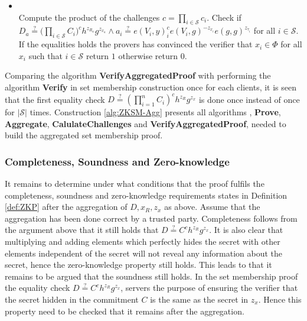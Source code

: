 \begin{algorithm}[]
\begin{itemize}
\item{} \\
Compute the product of the challenges $c=\prod_{i\in\mathcal{S}} c_i$. Check if $D_a\overset{?}{=} \big( \prod_{i\in\mathcal{S}}C_i\big)^ch^{z_R_a}g^{z_x_a}\wedge a_i \overset{?}{=} e(V_i,y)^c_i e(V_i,g)^{-z_{x_i}}e(g,g)^{z_{\tau_i}}$ for all $i\in\mathcal{S}$. If the equalities holds the provers has convinced the verifier that $x_i\in\Phi$ for all $x_i$ such that $i\in\mathcal{S}$ return $1$ otherwise return $0$.
\end{itemize}
\label{alg:ZKSM-Agg}
\end{algorithm} 
 
Comparing the algorithm \textbf{VerifyAggregatedProof} with performing the algorithm \textbf{Verify} in set membership construction once for each clients, it is seen that the first equality check $D \overset{?}{=}( \prod_{i=1}^n C_i )^{c}h^{z_R}g^{z_x}$ is done once instead of once for $|\mathcal{S}|$ times. Construction \ref{alg:ZKSM-Agg} presents all algorithms ,  \textbf{Prove}, \textbf{Aggregate}, \textbf{CalulateChallenges} and \textbf{VerifyAggregatedProof}, needed to build the aggregated set membership proof. 



\subsubsection*{Completeness, Soundness and Zero-knowledge}
It remains to determine under what conditions that the proof fulfils the completeness, soundness and zero-knowledge requirements states in Definition \ref{def:ZKP} after the aggregation of $D,x_R,z_x$ as above. Assume that the aggregation has been done correct by a trusted party. Completeness follows from the argument above that it still holds that $D\overset{?}{=}C^ch^{z_R}g^{z_x}$. It is also clear that multiplying and adding elements which perfectly hides the secret with other elements independent of the secret will not reveal any information about the secret, hence the zero-knowledge property still holds. This leads to that it remains to be argued that the soundness still holds. In the set membership proof the equality check $D\overset{?}{=}C^ch^{z_R}g^{z_x}$, servers the purpose of ensuring the verifier that the secret hidden in the commitment $C$ is the same as the secret in $z_x$. Hence this property need to be checked that it remains after the aggregation.

